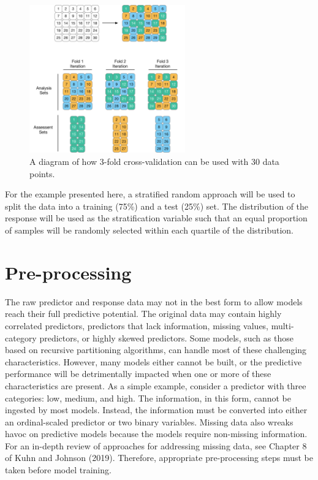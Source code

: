 \documentclass[
  letterpaper,
  DIV=11,
  numbers=noendperiod]{scrartcl}
\begin{document}
\begin{figure}[t!]

{\centering \includegraphics[width=0.6\textwidth,height=\textheight]{premade/three-CV.pdf}

}

\caption{\label{fig-three-fold}A diagram of how 3-fold cross-validation
can be used with 30 data points.}

\end{figure}

For the example presented here, a stratified random approach will be
used to split the data into a training (75\%) and a test (25\%) set. The
distribution of the response will be used as the stratification variable
such that an equal proportion of samples will be randomly selected
within each quartile of the distribution.

\hypertarget{sec-pre-processing}{%
\section{Pre-processing}\label{sec-pre-processing}}

The raw predictor and response data may not in the best form to allow
models reach their full predictive potential. The original data may
contain highly correlated predictors, predictors that lack information,
missing values, multi-category predictors, or highly skewed predictors.
Some models, such as those based on recursive partitioning algorithms,
can handle most of these challenging characteristics. However, many
models either cannot be built, or the predictive performance will be
detrimentally impacted when one or more of these characteristics are
present. As a simple example, consider a predictor with three
categories: low, medium, and high. The information, in this form, cannot
be ingested by most models. Instead, the information must be converted
into either an ordinal-scaled predictor or two binary variables. Missing
data also wreaks havoc on predictive models because the models require
non-missing information. For an in-depth review of approaches for
addressing missing data, see Chapter 8 of Kuhn and Johnson (2019).
Therefore, appropriate pre-processing steps must be taken before model
training.
\end{document}
